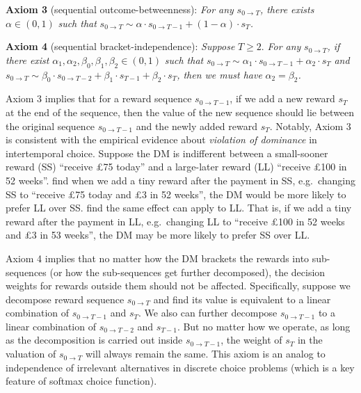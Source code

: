 \documentclass[
  12pt,
]{article}
\begin{document}
\noindent \textbf{Axiom 3} (sequential outcome-betweenness): \emph{For
any} \(s_{0\rightarrow T}\)\emph{, there exists} \(\alpha\in(0,1)\)
\emph{such that}
\(s_{0\rightarrow T} \sim \alpha\cdot s_{0\rightarrow T-1}+(1-\alpha) \cdot s_T\)\emph{.}

\noindent \textbf{Axiom 4} (sequential bracket-independence):
\emph{Suppose} \(T\geq 2\). \emph{For any} \(s_{0\rightarrow T}\)\emph{,
if there exist} \(\alpha_1,\alpha_2,\beta_0,\beta_1,\beta_2\in(0,1)\)
\emph{such that}
\(s_{0\rightarrow T}\sim \alpha_1 \cdot s_{0\rightarrow T-1} + \alpha_2 \cdot s_{T}\)
\emph{and}
\(s_{0\rightarrow T}\sim \beta_0 \cdot s_{0\rightarrow T-2}+\beta_1 \cdot s_{T-1}+\beta_2 \cdot s_{T}\)\emph{,
then we must have} \(\alpha_2 = \beta_2\)\emph{.}

Axiom 3 implies that for a reward sequence \(s_{0\rightarrow T-1}\), if
we add a new reward \(s_T\) at the end of the sequence, then the value
of the new sequence should lie between the original sequence
\(s_{0\rightarrow T-1}\) and the newly added reward \(s_T\). Notably,
Axiom 3 is consistent with the empirical evidence about \emph{violation
of dominance} \citep{scholten2014better, jiang2017better} in
intertemporal choice. Suppose the DM is indifferent between a
small-sooner reward (SS) ``receive £75 today'' and a large-later reward
(LL) ``receive £100 in 52 weeks''. \citet{scholten2014better} find when
we add a tiny reward after the payment in SS, e.g.~changing SS to
``receive £75 today and £3 in 52 weeks'', the DM would be more likely to
prefer LL over SS. \citet{jiang2017better} find the same effect can
apply to LL. That is, if we add a tiny reward after the payment in LL,
e.g.~changing LL to ``receive £100 in 52 weeks and £3 in 53 weeks'', the
DM may be more likely to prefer SS over LL.

Axiom 4 implies that no matter how the DM brackets the rewards into
sub-sequences (or how the sub-sequences get further decomposed), the
decision weights for rewards outside them should not be affected.
Specifically, suppose we decompose reward sequence
\(s_{0\rightarrow T}\) and find its value is equivalent to a linear
combination of \(s_{0\rightarrow T-1}\) and \(s_T\). We also can further
decompose \(s_{0\rightarrow T-1}\) to a linear combination of
\(s_{0\rightarrow T-2}\) and \(s_{T-1}\). But no matter how we operate,
as long as the decomposition is carried out inside
\(s_{0\rightarrow T-1}\), the weight of \(s_T\) in the valuation of
\(s_{0\rightarrow T}\) will always remain the same. This axiom is an
analog to independence of irrelevant alternatives in discrete choice
problems (which is a key feature of softmax choice function).
\end{document}
